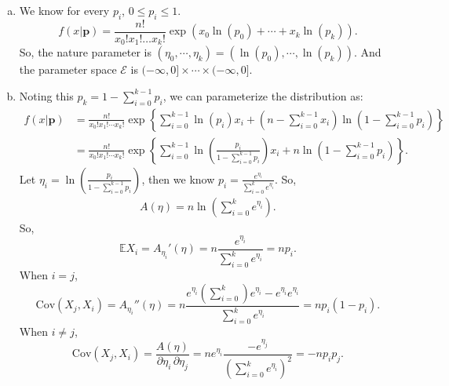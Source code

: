 \begin{solution}
	\begin{enumerate}[(a)]
		\item We know for every $p_i$, \(0\leqslant p_i\leqslant 1\).
		\[
			f(x|\mathbf{p})=\frac{n !}{x_{0} ! x_{1} ! \ldots x_{k} !} \exp\left(x_0\ln (p_0)+\cdots+x_k\ln (p_k)\right).
		\]
		So, the nature parameter is $(\eta_0,\cdots,\eta_k)=(\ln(p_0),\cdots,\ln(p_k))$. And the parameter space \(\mathcal{E}\) is \((-\infty,0]\times\cdots\times(-\infty,0]\).
		\item Noting this $p_{k}=1-\sum_{i=0}^{k-1}p_i$, we can parameterize the distribution as:
		\[
			\begin{aligned}
				f(x|\mathbf{p})&=\frac{n!}{x_0!x_1!\cdots x_k!}\exp\left\{\sum_{i=0}^{k-1}\ln(p_i)x_i+\left(n-\sum_{i=0}^{k-1}x_i\right)\ln\left(1-\sum_{i=0}^{k-1}p_i\right)\right\}\\
				&=\frac{n!}{x_0!x_1!\cdots x_k!}\exp\left\{\sum_{i=0}^{k-1}\ln\left(\frac{p_i}{1-\sum_{i=0}^{k-1}p_i}\right)x_i+n\ln\left(1-\sum_{i=0}^{k-1}p_i\right)\right\}.
			\end{aligned}
		\]
		Let $\eta_i=\ln\left(\frac{p_i}{1-\sum_{i=0}^{k-1}p_i}\right)$, then we know $p_i=\frac{e^{\eta_i}}{\sum_{i=0}^ke^{\eta_i}}$. So,
		\[
			\begin{aligned}
				A(\eta)=n\ln\left(\sum_{i=0}^ke^{\eta_i}\right).
			\end{aligned}
		\]
		So,
		\[
			\mathbb{E}X_i=A_{\eta_i}'(\eta)=n\frac{e^{\eta_i}}{\sum_{i=0}^ke^{\eta_i}}=np_i.
		\]
		When $i=j$,
		\[
			\text{Cov}(X_j,X_i)=A_{\eta_i}''(\eta)=n\frac{e^{\eta_i}(\sum_{i=0}^k)e^{\eta_i}-e^{\eta_i}e^{\eta_i}}{\sum_{i=0}^ke^{\eta_i}}=np_i(1-p_i).
		\]
		When $i\not=j$,
		\[
			\text{Cov}(X_j,X_i)=\frac{A(\eta)}{\partial\eta_i\,\partial\eta_j}=ne^{\eta_i}\frac{-e^{\eta_j}}{(\sum_{i=0}^ke^{\eta_i})^2}=-np_ip_j.
		\]
	\end{enumerate}
\end{solution}


